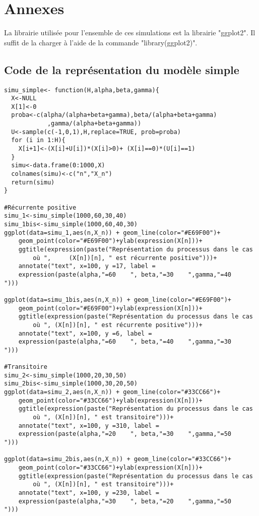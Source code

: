 \documentclass[12pt,a4paper]{report}
\theoremstyle{remark}
\begin{document}
\chapter*{Annexes}
La librairie utilisée pour l'ensemble de ces simulations est la librairie "ggplot2". Il suffit de la charger à l'aide de la commande "library(ggplot2)".

\section*{Code de la représentation du modèle simple}

\begin{lstlisting}
simu_simple<- function(H,alpha,beta,gamma){
  X<-NULL
  X[1]<-0
  proba<-c(alpha/(alpha+beta+gamma),beta/(alpha+beta+gamma)
            ,gamma/(alpha+beta+gamma))
  U<-sample(c(-1,0,1),H,replace=TRUE, prob=proba)
  for (i in 1:H){
    X[i+1]<-(X[i]+U[i])*(X[i]>0)+ (X[i]==0)*(U[i]==1)
  }
  simu<-data.frame(0:1000,X)
  colnames(simu)<-c("n","X_n")
  return(simu)
}

#Récurrente positive
simu_1<-simu_simple(1000,60,30,40)
simu_1bis<-simu_simple(1000,60,40,30)
ggplot(data=simu_1,aes(n,X_n)) + geom_line(color="#E69F00")+
    geom_point(color="#E69F00")+ylab(expression(X[n]))+ 
    ggtitle(expression(paste("Représentation du processus dans le cas 
        où ",     (X[n])[n], " est récurrente positive")))+
    annotate("text", x=100, y =17, label = 
    expression(paste(alpha,"=60    ", beta,"=30    ",gamma,"=40    ")))

ggplot(data=simu_1bis,aes(n,X_n)) + geom_line(color="#E69F00")+
    geom_point(color="#E69F00")+ylab(expression(X[n]))+
    ggtitle(expression(paste("Représentation du processus dans le cas
        où ", (X[n])[n], " est récurrente positive")))+
    annotate("text", x=100, y =6, label =
    expression(paste(alpha,"=60    ", beta,"=40    ",gamma,"=30    ")))

#Transitoire
simu_2<-simu_simple(1000,20,30,50)
simu_2bis<-simu_simple(1000,30,20,50)
ggplot(data=simu_2,aes(n,X_n)) + geom_line(color="#33CC66")+
    geom_point(color="#33CC66")+ylab(expression(X[n]))+ 
    ggtitle(expression(paste("Représentation du processus dans le cas 
        où ", (X[n])[n], " est transitoire")))+
    annotate("text", x=100, y =310, label = 
    expression(paste(alpha,"=20    ", beta,"=30    ",gamma,"=50    ")))
    
ggplot(data=simu_2bis,aes(n,X_n)) + geom_line(color="#33CC66")+
    geom_point(color="#33CC66")+ylab(expression(X[n]))+ 
    ggtitle(expression(paste("Représentation du processus dans le cas 
        où ", (X[n])[n], " est transitoire")))+
    annotate("text", x=100, y =230, label = 
    expression(paste(alpha,"=30    ", beta,"=20    ",gamma,"=50    ")))


\end{lstlisting}
\end{document}
